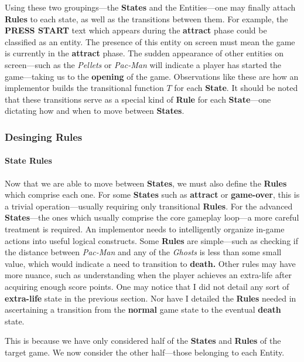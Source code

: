 \documentclass{report}
\newcommand{\state}[1]{\textbf{#1}}
\newcommand{\rules}{\textbf{Rules}\xspace}
\newcommand{\imp}{implementor\xspace}
\begin{document}
Using these two groupings---the \state{States} and the Entities---one may finally attach \rules to each state, as well as the transitions between them. For example, the \textbf{PRESS START} text which appears during the \state{attract} phase could be classified as an entity. The presence of this entity on screen must mean the game is currently in the \state{attract} phase. The sudden appearance of other entities on screen---such as the \emph{Pellets} or \emph{Pac-Man} will indicate a player has started the game---taking us to the \state{opening} of the game. Observations like these are how an \imp builds the transitional function $T$ for each \state{State}. It should be noted that these transitions serve as a special kind of \state{Rule} for each \state{State}---one dictating how and when to move between \state{States}.

\subsubsection{Desinging \state{Rules}}

\paragraph{State Rules}

Now that we are able to move between \state{States}, we must also define the \rules which comprise each one. For some \state{States} such as \state{attract} or \state{game-over}, this is a trivial operation---usually requiring only transitional \rules. For the advanced \state{States}---the ones which usually comprise the core gameplay loop---a more careful treatment is required. An \imp needs to intelligently organize in-game actions into useful logical constructs. Some \rules are simple---such as checking if the distance between \emph{Pac-Man} and any of the \emph{Ghosts} is less than some small value, which would indicate a need to transition to \state{death.} Other rules may have more nuance, such as understanding when the player achieves an extra-life after acquiring enough score points.
One may notice that I did not detail any sort of \state{extra-life} state in the previous section. Nor have I detailed the \rules needed in ascertaining a transition from the \state{normal} game state to the eventual \state{death} state. 

This is because we have only considered half of the \state{States} and \rules of the target game. We now consider the other half---those belonging to each Entity. 
\end{document}
